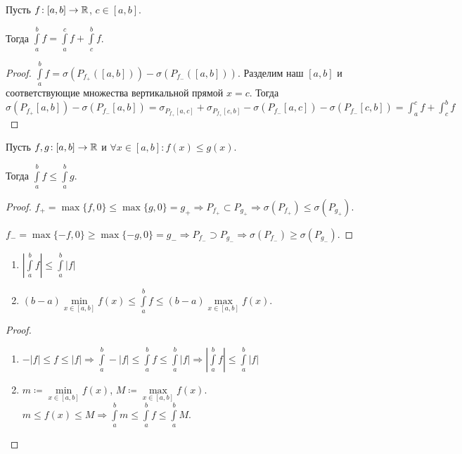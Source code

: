 \begin{theorem}
    Пусть $f\!: [a, b] \to \mathbb{R}$,  $c \in [a, b]$.

    Тогда  $\int\limits_a^b f = \int\limits_a^c f + \int\limits_c^b f$.
\end{theorem}
\begin{proof}
	$\int\limits_a^b f = \sigma(P_{f_+}([a, b])) - \sigma(P_{f_-}([a, b]))$. Разделим наш $[a, b]$ и соответствующие множества вертикальной прямой $x=c$. Тогда $\sigma(P_{f_+}[a, b]) - \sigma(P_{f_-}[a, b]) = \sigma_{P_{f_+}[a, c]} + \sigma_{P_{f_+}[c, b]} - \sigma(P_{f_-}[a, c]) - \sigma(P_{f_-}[c, b]) = \int_a^c f + \int_c^b f$
\end{proof}
\begin{theorem}
    Пусть $f, g\!: [a, b] \to \mathbb{R}$ и  $\forall x \in [a, b]\!: f(x) \le g(x)$.

    Тогда $\int\limits_a^b f \le \int\limits_a^b g$. 
\end{theorem}
\begin{proof}
    $f_+ = \max\{f, 0\} \le \max\{g, 0\} = g_+ \Rightarrow P_{f_+} \subset P_{g_+} \Rightarrow \sigma(P_{f_+}) \le \sigma(P_{g_+})$.

    $f_- = \max\{-f, 0\} \ge \max\{-g, 0\} = g_- \Rightarrow P_{f_-} \supset P_{g_-} \Rightarrow \sigma(P_{f_-}) \ge \sigma(P_{g_-})$.
\end{proof}
\begin{consequence}
    \begin{enumerate}
        \item $|\int\limits_a^b f| \le \int\limits_a^b |f|$ 
        \item $(b-a)\min\limits_{x \in [a, b]} f(x) \le \int\limits_a^b f \le (b-a)\max\limits_{x \in [a, b]} f(x)$.
    \end{enumerate}
\end{consequence}
\begin{proof}
    \begin{enumerate}
        \item $-|f| \le f \le |f| \Rightarrow \int\limits_a^b -|f| \le \int\limits_a^b f \le \int\limits_a^b |f| \Rightarrow |\int\limits_a^b f| \le \int\limits_a^b |f|$
	\item $m \coloneqq \min\limits_{x \in [a, b]} f(x)$,  $M \coloneqq \max\limits_{x \in [a, b]} f(x)$.  $m \le f(x) \le M \Rightarrow \int\limits_a^b m \le \int\limits_a^b f \le \int\limits_a^b M$.
    \end{enumerate}
\end{proof}
